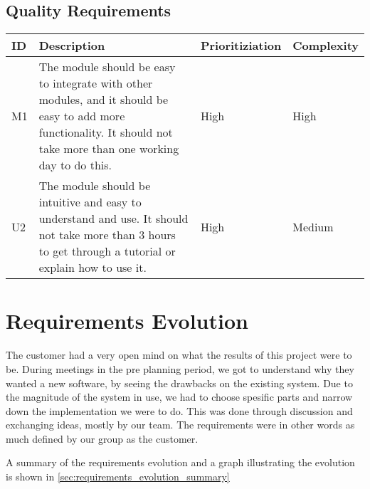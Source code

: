 \documentclass{report}
\begin{document}
\subsection{Quality Requirements} \label{subsec:quality_requirements}
\begin{tabular}{| l | p{5.9cm} | l | l |} \hline
ID & Description & Prioritiziation & Complexity \\ \hline
M1 & The module should be easy to integrate with other modules, and it should be easy to add more functionality. It should not take more than one working day to do this. & High & High \\ \hline
U2 & The module should be intuitive and easy to understand and use. It should not take more than 3 hours to get through a tutorial or explain how to use it. & High & Medium \\ \hline
\end{tabular}

\section{Requirements Evolution} \label{sec:requirements_evolution}

The customer had a very open mind on what the results of this project were to be. During meetings in the pre planning period, we got to understand why they wanted a new software, by seeing the drawbacks on the existing system. Due to the magnitude of the system in use, we had to choose spesific parts and narrow down the implementation we were to do. This was done through discussion and exchanging ideas, mostly by our team. The requirements were in other words as much defined by our group as the customer.

A summary of the requirements evolution and a graph illustrating the evolution is shown in \ref{sec:requirements_evolution_summary}
\end{document}
